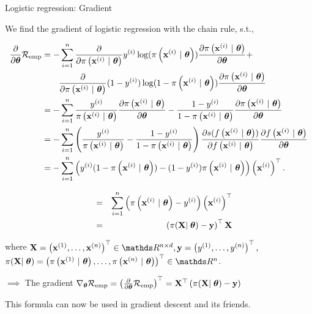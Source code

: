 \documentclass[11pt,compress,t,notes=noshow, xcolor=table]{beamer}
\begin{document}
\begin{vbframe}{Logistic regression: Gradient}

We find the gradient of logistic regression with the chain rule, s.t., 

\vspace*{-0.5cm}

{\small
\begin{align*}
  \frac{\partial}{\partial\thetab}\riske  & =  
 -\sumin \frac{\partial}{\partial\pixit }\yi\log(\pixit)\frac{\partial\pixit}{\partial \thetab} +  \\
 & \qquad \frac{\partial}{\partial\pixit} (1-\yi)\log(1-\pixit)\frac{\partial\pixit}{\partial \thetab}\\
 & =  
 -\sumin \frac{\yi}{\pixit}\frac{\partial\pixit}{\partial \thetab} -  \frac{1-\yi}{1-\pixit}\frac{\partial\pixit}{\partial \thetab}\\
 &=  
  -\sumin \left(\frac{\yi}{\pixit} -  \frac{1-\yi}{1-\pixit}\right)\frac{\partial s(\fxit)}{\partial  \fxit}\frac{\partial  \fxit}{\partial\thetab}\\
  &=  
  -\sum^n_{i=1} \left(\yi(1-\pixit)  -  (1-\yi)\pixit \right)\left(\xi\right)^\top.\\
\end{align*}
}


\framebreak
\begin{align*}
  \quad &=& 
  \sumin \left(\pixit - \yi\right)\left(\xi\right)^\top\\
    \quad &=& 
  \left(\pi(\mathbf{X}\vert\;\thetab) - \mathbf{y}\right)^\top\mathbf{X}\\
\end{align*}

where  $\mathbf{X} = \left(
    \xi[1], \dots, 
    \xi[n]\right)^\top \in \R^{n\times d}, \mathbf{y} = \left(
    \yi[1], \dots,
    \yi[n]
\right)^\top,$ \\ $\pi(\mathbf{X}\vert\;\thetab) = \left(
    \pixit[1], \dots,
    \pixit[n]
\right)^\top \in \R^{n}$.

\vspace*{1cm}

$\implies$ The gradient $\nabla_{\thetab}\riske = \left(\frac{\partial}{\partial\thetab}\riske\right)^\top =  \mathbf{X}^\top\left(\pi(\mathbf{X}\vert\;\thetab) - \mathbf{y}\right)$ 

\vspace*{1cm}

This formula can now be used in gradient descent and its friends.

\end{vbframe}
\end{document}
